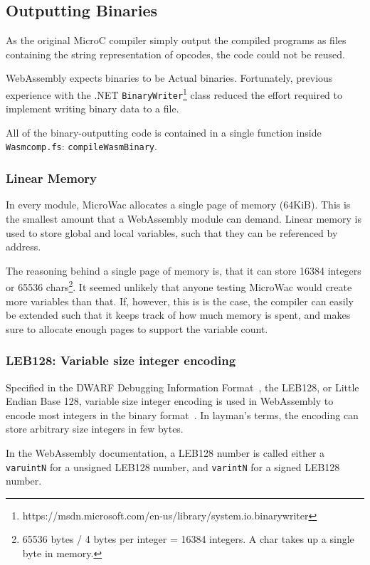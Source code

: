 \documentclass[a4paper]{article}
\begin{document}
\subsection{Outputting Binaries}
As the original MicroC compiler simply output the compiled programs as files containing the string representation of opcodes, the code could not be reused.

WebAssembly expects binaries to be Actual binaries. Fortunately, previous experience with the .NET \texttt{BinaryWriter}\footnote{https://msdn.microsoft.com/en-us/library/system.io.binarywriter} class reduced the effort required to implement writing binary data to a file.

All of the binary-outputting code is contained in a single function inside \texttt{Wasmcomp.fs}: \texttt{compileWasmBinary}.

\subsubsection{Linear Memory}
\label{sec:technical:webassembly:memory}
In every module, MicroWac allocates a single page of memory (64KiB). This is the smallest amount that a WebAssembly module can demand. Linear memory is used to store global and local variables, such that they can be referenced by address.

The reasoning behind a single page of memory is, that it can store 16384 integers or 65536 chars\footnote{65536 bytes / 4 bytes per integer = 16384 integers. A char takes up a single byte in memory.}. It seemed unlikely that anyone testing MicroWac would create more variables than that. If, however, this is is the case, the compiler can easily be extended such that it keeps track of how much memory is spent, and makes sure to allocate enough pages to support the variable count.

\subsubsection{LEB128: Variable size integer encoding}
Specified in the DWARF Debugging Information Format~\cite{DWARF}, the LEB128, or Little Endian Base 128, variable size integer encoding is used in WebAssembly to encode most integers in the binary format~\cite[\#numbers]{website:wasm-binary-encoding}. In layman's terms, the encoding can store arbitrary size integers in few bytes.

In the WebAssembly documentation, a LEB128 number is called either a \texttt{varuintN} for a unsigned LEB128 number, and \texttt{varintN} for a signed LEB128 number.
\end{document}
